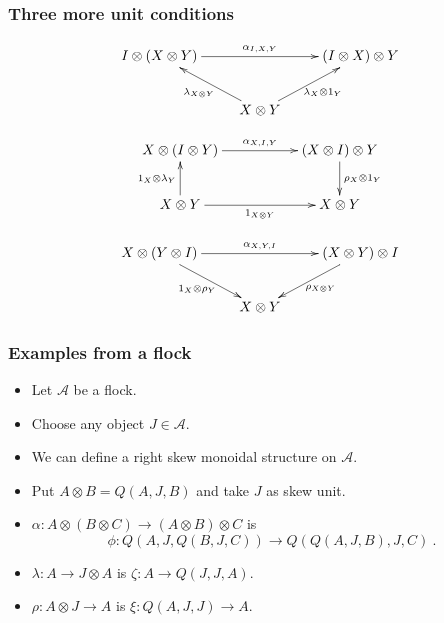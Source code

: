 \documentclass{beamer}
\newcommand{\lra}{\longrightarrow}
\def\CA{{\mathscr A}}
\begin{document}
\begin{frame}
  \frametitle{Three more unit conditions}
\begin{equation}\label{leftunit}
\xymatrix{
 I\otimes (X\otimes Y)\ar[rr]^{\alpha_{I,X,Y}}   && (I\otimes X)\otimes Y  \\
& X\otimes Y \ar[lu]^{\lambda_{X\otimes Y}} \ar[ru]_{\lambda_{X} \otimes 1_Y}  &
}
\end{equation}

\begin{equation}\label{midunit}
\xymatrix{
 X\otimes (I\otimes Y)\ar[rr]^-{\alpha_{X,I,Y}} && (X\otimes I)\otimes Y \ar[d]^-{\rho_X \otimes 1_Y} \\
X\otimes Y \ar[u]^-{1_X\otimes \lambda_Y} \ar[rr]_-{1_{X\otimes Y}} && X\otimes Y}
\end{equation}

\begin{equation}\label{rightunit}
\xymatrix{
X\otimes (Y\otimes I) \ar[rr]^{\alpha_{X,Y,I}} \ar[rd]_{1_X\otimes \rho_Y}   && (X\otimes Y)\otimes I  \ar[ld]^{\rho_{X \otimes Y}} \\
& X\otimes Y   &
}
\end{equation}
\end{frame}

\begin{frame}
  \frametitle{Examples from a flock}
  
 \begin{itemize}
\item<1->  Let $\CA$ be a flock. 
\item<2-> Choose any object $J\in \CA$. 
\item<3-> We can define a right skew monoidal structure on $\CA$.
\item<4-> Put $A\otimes B = Q(A,J,B)$ and take $J$ as skew unit.
\item<5-> $\alpha : A\otimes (B\otimes C) \lra (A\otimes B)\otimes C$ is 
$$\phi : Q(A,J,Q(B,J,C)) \lra Q(Q(A,J,B),J,C) \ .$$
\item<6-> $\lambda : A \lra J\otimes A$ is $\zeta : A \lra Q(J,J,A)$.
\item<7-> $\rho : A\otimes J \lra A$ is $\xi : Q(A,J,J) \lra A$.
\end{itemize}

\end{frame}
\end{document}
